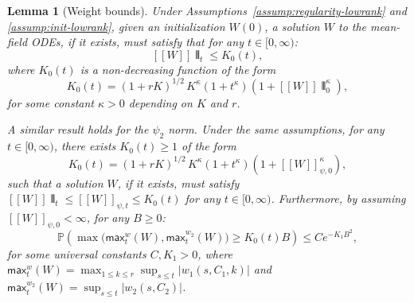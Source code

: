 \documentclass[11pt]{article}
\newcommand{\Pp}{\mathbb{P}}
\newcommand{\1}{\mathbbm{1}}
\newcommand{\llbracket}{[\![}
\newcommand{\rrbracket}{]\!]}
\newcommand{\interleave}[1]{\llbracket #1 \rrbracket}
\newtheorem{lemma}{Lemma}
\begin{document}
\begin{lemma}[Weight bounds]
\label{lem:bounds-a-priori}
Under Assumptions~\ref{assump:regularity-lowrank} and \ref{assump:init-lowrank}, given an initialization $W(0)$, a solution $W$ to the mean-field ODEs, if it exists, must satisfy that for any $t\in[0,\infty)$:
\[
\interleave W\interleave_t \le K_0(t),
\]
where $K_0(t)$ is a non-decreasing function of the form
\[
K_0(t) = (1+rK)^{1/2}\,K^{\kappa}(1+t^{\kappa})(1+\interleave W\interleave_0^{\kappa}),
\]
for some constant $\kappa>0$ depending on $K$ and $r$.

A similar result holds for the $\psi_2$ norm. Under the same assumptions, for any $t\in[0,\infty)$, there exists $K_0(t)\ge 1$ of the form
\[
K_0(t) = (1+rK)^{1/2}\,K^{\kappa}(1+t^{\kappa})(1+\llbracket W\rrbracket_{\psi,0}^{\kappa}),
\]
such that a solution $W$, if it exists, must satisfy $\interleave W\interleave_t \le \llbracket W\rrbracket_{\psi,t} \le K_0(t)$ for any $t\in[0,\infty)$. Furthermore, by assuming $\llbracket W\rrbracket_{\psi,0}<\infty$, for any $B\ge 0$:
\[
\Pp\!\left(\max\big(\mathsf{max}_t^w(W), \mathsf{max}_t^{w_2}(W)\big)\ge K_0(t)B\right) \le C e^{-K_1 B^2},
\]
for some universal constants $C, K_1>0$, where $\mathsf{max}_t^w(W) = \max_{1\le k\le r}\sup_{s\le t}|w_1(s,C_1,k)|$ and $\mathsf{max}_t^{w_2}(W) = \sup_{s\le t}|w_2(s,C_2)|$.
\end{lemma}
\end{document}
